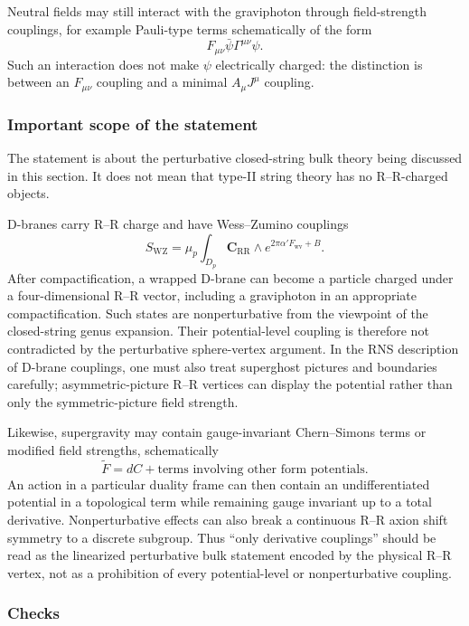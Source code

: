 \documentclass[
  10pt,
  a4paper,
  openany]{book}
\begin{document}
Neutral fields may still interact with the graviphoton through
field-strength couplings, for example Pauli-type terms schematically of
the form \[
F_{\mu\nu}\bar\psi\Gamma^{\mu\nu}\psi.
\] Such an interaction does not make \(\psi\) electrically charged: the
distinction is between an \(F_{\mu\nu}\) coupling and a minimal
\(A_\mu J^\mu\) coupling.

\subsubsection{Important scope of the
statement}\label{important-scope-of-the-statement}

The statement is about the perturbative closed-string bulk theory being
discussed in this section. It does not mean that type-II string theory
has no R--R-charged objects.

D-branes carry R--R charge and have Wess--Zumino couplings \[
S_{\mathrm{WZ}}
=
\mu_p\int_{D_p}
\mathbf C_{\mathrm{RR}}\wedge
e^{2\pi\alpha'F_{\mathrm{wv}}+B}.
\] After compactification, a wrapped D-brane can become a particle
charged under a four-dimensional R--R vector, including a graviphoton in
an appropriate compactification. Such states are nonperturbative from
the viewpoint of the closed-string genus expansion. Their
potential-level coupling is therefore not contradicted by the
perturbative sphere-vertex argument. In the RNS description of D-brane
couplings, one must also treat superghost pictures and boundaries
carefully; asymmetric-picture R--R vertices can display the potential
rather than only the symmetric-picture field strength.

Likewise, supergravity may contain gauge-invariant Chern--Simons terms
or modified field strengths, schematically \[
\widetilde F=dC+\text{terms involving other form potentials}.
\] An action in a particular duality frame can then contain an
undifferentiated potential in a topological term while remaining gauge
invariant up to a total derivative. Nonperturbative effects can also
break a continuous R--R axion shift symmetry to a discrete subgroup.
Thus ``only derivative couplings'' should be read as the linearized
perturbative bulk statement encoded by the physical R--R vertex, not as
a prohibition of every potential-level or nonperturbative coupling.

\subsubsection{Checks}\label{checks-24}
\end{document}
